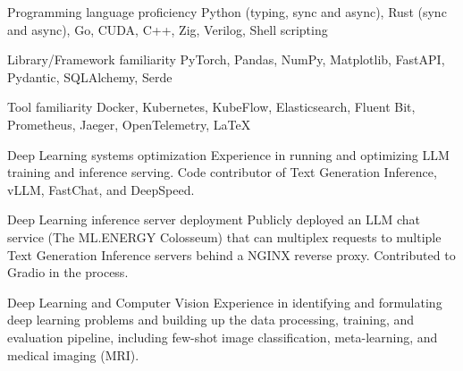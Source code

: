 

\begin{cvlist}

  \cvlistitem
    {Programming language proficiency} %
    {Python (typing, sync and async), Rust (sync and async), Go, CUDA, C++, Zig, Verilog, Shell scripting} %

  \cvlistitem
    {Library/Framework familiarity} %
    {PyTorch, Pandas, NumPy, Matplotlib, FastAPI, Pydantic, SQLAlchemy, Serde} %

  \cvlistitem
    {Tool familiarity} %
    {Docker, Kubernetes, KubeFlow, Elasticsearch, Fluent Bit, Prometheus, Jaeger, OpenTelemetry, LaTeX} %

  \cvlistitem
    {Deep Learning systems optimization} %
    {Experience in running and optimizing LLM training and inference serving. Code contributor of Text Generation Inference, vLLM, FastChat, and DeepSpeed.} %

  \cvlistitem
    {Deep Learning inference server deployment} %
    {Publicly deployed an LLM chat service (The ML.ENERGY Colosseum) that can multiplex requests to multiple Text Generation Inference servers behind a NGINX reverse proxy. Contributed to Gradio in the process.} %

  \cvlistitem
    {Deep Learning and Computer Vision} %
    {Experience in identifying and formulating deep learning problems and building up the data processing, training, and evaluation pipeline, including few-shot image classification, meta-learning, and medical imaging (MRI).} %

\end{cvlist}
